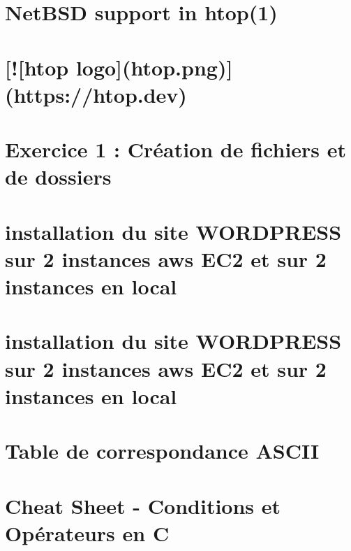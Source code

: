 \documentclass[twoside]{book}
\newcommand{\+}{\discretionary{\mbox{\scriptsize$\hookleftarrow$}}{}{}}
\begin{document}
\chapter{Net\+B\+SD support in htop(1)}
\label{md_linux_download_htop-3_83_80_netbsd_README}

\chapter{\mbox{[}!\mbox{[}htop logo\mbox{]}(htop.\+png)\mbox{]}(https\+://htop.dev)}
\label{md_linux_download_htop-3_83_80_README}

\chapter{Exercice 1 \+: Création de fichiers et de dossiers}
\label{md_linux_exo1_commande_desmedt}

\chapter{installation du site W\+O\+R\+D\+P\+R\+E\+SS sur 2 instances aws E\+C2 et sur 2 instances en local}
\label{md_linux_install_wordPress_aws}

\chapter{installation du site W\+O\+R\+D\+P\+R\+E\+SS sur 2 instances aws E\+C2 et sur 2 instances en local}
\label{md_linux_install_wordPress_aws_securised}

\chapter{Table de correspondance A\+S\+C\+II}
\label{md_programmation_C_cheatsheet_ascii_correspondence}

\chapter{Cheat Sheet -\/ Conditions et Opérateurs en C}
\label{md_programmation_C_cheatsheet_c_conditions_operators_cheatsheet}

\end{document}
